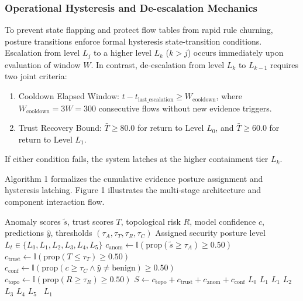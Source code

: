 \documentclass[journal,10pt,onecolumn]{IEEEtran}
\begin{document}
\subsubsection{Operational Hysteresis and De-escalation Mechanics}
To prevent state flapping and protect flow tables from rapid rule churning, posture transitions enforce formal hysteresis state-transition conditions. Escalation from level $L_j$ to a higher level $L_k$ ($k > j$) occurs immediately upon evaluation of window $W$. In contrast, de-escalation from level $L_k$ to $L_{k-1}$ requires two joint criteria:
\begin{enumerate}
  \item Cooldown Elapsed Window: $t - t_{\text{last\_escalation}} \ge W_{\text{cooldown}}$, where $W_{\text{cooldown}} = 3W = 300$ consecutive flows without new evidence triggers.
  \item Trust Recovery Bound: $\bar{T} \ge 80.0$ for return to Level $L_0$, and $\bar{T} \ge 60.0$ for return to Level $L_1$.
\end{enumerate}
If either condition fails, the system latches at the higher containment tier $L_k$.

Algorithm 1 formalizes the cumulative evidence posture assignment and hysteresis latching. Figure 1 illustrates the multi-stage architecture and component interaction flow.

\begin{algorithm}[t]
\caption{Multi-Stage Security Posture Level Escalation Synthesis}
\label{alg:posture_synthesis}
\begin{algorithmic}[1]
\Require Anomaly scores $\tilde{s}$, trust scores $T$, topological risk $R$, model confidence $c$, predictions $\hat{y}$, thresholds $(\tau_A, \tau_T, \tau_R, \tau_C)$
\Ensure Assigned security posture level $L_t \in \{L_0, L_1, L_2, L_3, L_4, L_5\}$
\State $c_{\text{anom}} \leftarrow \mathbb{I}(\text{prop}(\tilde{s} \ge \tau_A) \ge 0.50)$
\State $c_{\text{trust}} \leftarrow \mathbb{I}(\text{prop}(T \le \tau_T) \ge 0.50)$
\State $c_{\text{conf}} \leftarrow \mathbb{I}(\text{prop}(c \ge \tau_C \land \hat{y} \ne \text{benign}) \ge 0.50)$
\State $c_{\text{topo}} \leftarrow \mathbb{I}(\text{prop}(R \ge \tau_R) \ge 0.50)$
\State $S \leftarrow c_{\text{topo}} + c_{\text{trust}} + c_{\text{anom}} + c_{\text{conf}}$
 \Return $L_0$ 
 \Return $L_1$ 
 \Return $L_1$ 
 \Return $L_2$ 
 \Return $L_3$ 
 \Return $L_4$ 
 \Return $L_5$ 
\Else \ \Return $L_1$ 
\EndIf
\end{algorithmic}
\end{algorithm}
\end{document}
